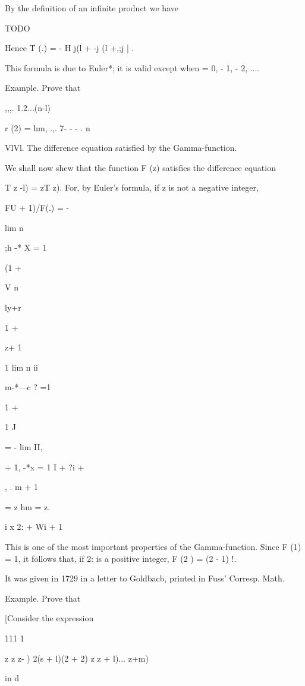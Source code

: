 %
%



By the definition of an
infinite product we have

TODO

Hence T (.) = - H j(l + -j (l +,;j | .

This formula is due to Euler*; it is valid except when = 0, - 1, - 2,
....

Example. Prove that

,,,. 1.2...(n-l)

r (2) = hm, .,. 7- - - . n\


VlVl. The difference equation satisfied by the Gamma-function.

We shall now shew that the function F (z) satisfies the difference
equation

T z -l) = zT z). For, by Euler's formula, if z is not a negative
integer,

FU + 1)/F(.) = -

lim n

;h -* X = 1

(1 +

V n

ly+r

1 +

z+ 1

1 lim n ii

m-*---c ? =1

1 +

1 J

= - lim II,

  + 1, -*x = 1 I + ?i +

, . m + 1

= z hm = z.

 i x 2: + Wi + 1

This is one of the most important properties of the Gamma-function.
Since F (1) = 1, it follows that, if 2: is a positive integer, F (2 )
= (2 - 1) !.

It was given in 1729 in a letter to Goldbacb, printed in Fuss'
Corresp. Math.

%
%

Example. Prove that

[Consider the expression

111 1

z z z- ) 2(s + l)(2 + 2) z z + l)... z+m)

in d

